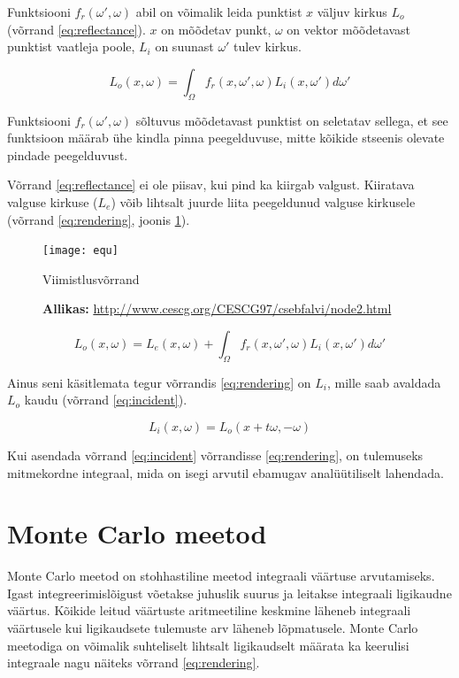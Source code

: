 \documentclass[a4paper,12pt]{report}
\begin{document}
Funktsiooni \(f_r(\omega', \omega)\) abil on võimalik leida punktist \(x\)
väljuv kirkus \(L_o\) (võrrand \ref{eq:reflectance}). \(x\) on mõõdetav
punkt, \(\omega\) on vektor mõõdetavast punktist vaatleja poole,
\(L_i\) on suunast \(\omega'\) tulev kirkus.

\begin{equation} \label{eq:reflectance}
L_o(x, \omega) = \int_\Omega f_r(x, \omega', \omega) L_i(x, \omega') d\omega'
\end{equation}

Funktsiooni \(f_r(\omega', \omega)\) sõltuvus mõõdetavast punktist on
seletatav sellega, et see funktsioon määrab ühe kindla pinna
peegelduvuse, mitte kõikide stseenis olevate pindade peegelduvust.

Võrrand \ref{eq:reflectance} ei ole piisav, kui pind ka kiirgab valgust.
Kiiratava valguse kirkuse (\(L_e\)) võib lihtsalt juurde liita peegeldunud valguse
kirkusele (võrrand \ref{eq:rendering}, joonis \ref{fig:equation}).

\begin{figure}[h]
\centering
\texttt{[image: equ]}
\caption{Viimistlusvõrrand}
\caption*{\textbf{Allikas:} \url{http://www.cescg.org/CESCG97/csebfalvi/node2.html}}
\label{fig:equation}
\end{figure}

\begin{equation} \label{eq:rendering}
L_o(x, \omega) = L_e(x, \omega) + \int_\Omega f_r(x, \omega', \omega) L_i(x, \omega') d\omega'
\end{equation}

Ainus seni käsitlemata tegur võrrandis \ref{eq:rendering} on \(L_i\),
mille saab avaldada \(L_o\) kaudu (võrrand \ref{eq:incident}). 

\begin{equation} \label{eq:incident}
L_i(x, \omega) = L_o(x + t\omega, -\omega)
\end{equation}

Kui asendada võrrand \ref{eq:incident} võrrandisse \ref{eq:rendering},
on tulemuseks mitmekordne integraal, mida on isegi arvutil ebamugav
analüütiliselt lahendada.

\section{Monte Carlo meetod}
Monte Carlo meetod on stohhastiline meetod integraali väärtuse arvutamiseks.
Igast integreerimislõigust võetakse juhuslik suurus ja leitakse integraali
ligikaudne väärtus. Kõikide leitud väärtuste aritmeetiline keskmine
läheneb integraali väärtusele kui ligikaudsete tulemuste arv läheneb
lõpmatusele. Monte Carlo meetodiga on võimalik suhteliselt lihtsalt
ligikaudselt määrata ka keerulisi integraale nagu näiteks võrrand \ref{eq:rendering}.
\end{document}
